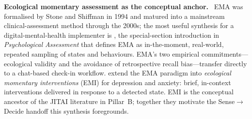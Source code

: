 \documentclass[10pt,conference]{article}
\renewcommand{\paragraph}[1]{\smallskip\par\noindent\textbf{#1}~\ignorespaces}
\begin{document}
\paragraph{Ecological momentary assessment as the conceptual anchor.}
EMA was formalised by Stone and Shiffman in 1994 and matured into a
mainstream clinical-assessment method through the 2000s; the most
useful synthesis for a digital-mental-health implementer is
\cite{Trull2009ESMEMA}, the special-section introduction in
\emph{Psychological Assessment} that defines EMA as in-the-moment,
real-world, repeated sampling of states and behaviours. EMA's two
empirical commitments---ecological validity and the avoidance of
retrospective recall bias---transfer directly to a chat-based check-in
workflow. \cite{Versluis2016EMI} extend the EMA paradigm into
\emph{ecological momentary interventions} (EMI) for depression and
anxiety: brief, in-context interventions delivered in response to a
detected state. EMI is the conceptual ancestor of the JITAI literature
in Pillar~B; together they motivate the Sense$\to$Decide handoff this
synthesis foregrounds.
\end{document}
